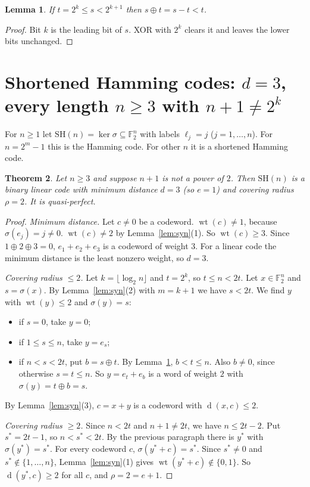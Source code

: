 \documentclass[11pt]{article}
\newtheorem{theorem}{Theorem}
\newtheorem{lemma}[theorem]{Lemma}
\theoremstyle{definition}
\theoremstyle{remark}
\newcommand{\F}{\mathbb{F}_2}
\newcommand{\wt}{\operatorname{wt}}
\newcommand{\dd}{\operatorname{d}}
\begin{document}
\begin{lemma}\label{lem:bit}
If $t=2^k\le s<2^{k+1}$ then $s\oplus t=s-t<t$.
\end{lemma}
\begin{proof}
Bit $k$ is the leading bit of $s$. XOR with $2^k$ clears it and leaves the
lower bits unchanged.
\end{proof}

\section{\texorpdfstring{Shortened Hamming codes: $d=3$, every length $n\ge 3$ with $n+1\ne 2^k$}{Shortened Hamming codes}}
For $n\ge 1$ let $\mathrm{SH}(n)=\ker\sigma\subseteq\F^n$ with labels
$\ell_j=j$ ($j=1,\dots,n$). For $n=2^m-1$ this is the Hamming code. For other
$n$ it is a shortened Hamming code.

\begin{theorem}\label{thm:sh}
Let $n\ge 3$ and suppose $n+1$ is not a power of $2$. Then $\mathrm{SH}(n)$ is
a binary linear code with minimum distance $d=3$ (so $e=1$) and covering
radius $\rho=2$. It is quasi-perfect.
\end{theorem}
\begin{proof}
\emph{Minimum distance.} Let $c\ne 0$ be a codeword. $\wt(c)\ne 1$, because
$\sigma(e_j)=j\ne 0$. $\wt(c)\ne 2$ by Lemma~\ref{lem:syn}(1). So
$\wt(c)\ge 3$. Since $1\oplus 2\oplus 3=0$, $e_1+e_2+e_3$ is a codeword of
weight $3$. For a linear code the minimum distance is the least nonzero weight,
so $d=3$.

\emph{Covering radius $\le 2$.} Let $k=\lfloor\log_2 n\rfloor$ and $t=2^k$, so
$t\le n<2t$. Let $x\in\F^n$ and $s=\sigma(x)$. By Lemma~\ref{lem:syn}(2) with
$m=k+1$ we have $s<2t$. We find $y$ with $\wt(y)\le 2$ and $\sigma(y)=s$:
\begin{itemize}
\item if $s=0$, take $y=0$;
\item if $1\le s\le n$, take $y=e_s$;
\item if $n<s<2t$, put $b=s\oplus t$. By Lemma~\ref{lem:bit}, $b<t\le n$.
Also $b\ne 0$, since otherwise $s=t\le n$. So $y=e_t+e_b$ is a word of weight
$2$ with $\sigma(y)=t\oplus b=s$.
\end{itemize}
By Lemma~\ref{lem:syn}(3), $c=x+y$ is a codeword with $\dd(x,c)\le 2$.

\emph{Covering radius $\ge 2$.} Since $n<2t$ and $n+1\ne 2t$, we have $n\le
2t-2$. Put $s^\ast=2t-1$, so $n<s^\ast<2t$. By the previous paragraph there is
$y^\ast$ with $\sigma(y^\ast)=s^\ast$. For every codeword $c$,
$\sigma(y^\ast+c)=s^\ast$. Since $s^\ast\ne 0$ and $s^\ast\notin\{1,\dots,n\}$,
Lemma~\ref{lem:syn}(1) gives $\wt(y^\ast+c)\notin\{0,1\}$. So
$\dd(y^\ast,c)\ge 2$ for all $c$, and $\rho=2=e+1$.
\end{proof}
\end{document}
